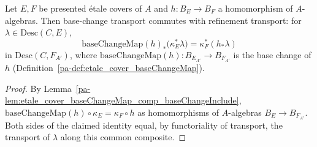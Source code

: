 \begin{lemma}
  \label{pa-lem:descentMap_baseChangeMap}
  \leanok

  Let \(E, F\) be presented \'etale covers of \(A\) and \(h \colon B_E \to B_F\) a
  homomorphism of \(A\)-algebras. Then base-change transport commutes with refinement
  transport: for \(\lambda \in \mathrm{Desc}(C,E)\),
  \[
    \mathrm{baseChangeMap}(h)_{*}\bigl(\kappa_{E}^{*}\lambda\bigr) = \kappa_{F}^{*}(h_{*}\lambda)
  \]
  in \(\mathrm{Desc}(C,F_{A'})\), where \(\mathrm{baseChangeMap}(h) \colon B_{E_{A'}} \to
  B_{F_{A'}}\) is the base change of \(h\) (Definition~\ref{pa-def:etale_cover_baseChangeMap}).
\end{lemma}
\begin{proof}
  \leanok
  By Lemma~\ref{pa-lem:etale_cover_baseChangeMap_comp_baseChangeInclude},
  \(\mathrm{baseChangeMap}(h) \circ \kappa_E = \kappa_F \circ h\) as homomorphisms of
  \(A\)-algebras \(B_E \to B_{F_{A'}}\). Both sides of the claimed identity equal, by
  functoriality of transport, the transport of \(\lambda\) along this common composite.
\end{proof}

